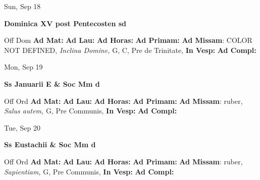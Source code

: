 \documentclass[10pt]{book}
\begin{document}
\begin{center}
\begin{minipage}{3.5in}
\vspace{2em}
\begin{center}Sun, Sep 18
\end{center}
\textbf{ \large Dominica XV post Pentecosten
\textnormal{\normalsize sd}}

\begin{justify}Off Dom
\textbf{Ad Mat: }
\textbf{Ad Lau: }
\textbf{Ad Horas: }
\textbf{Ad Primam: }\textbf{Ad Missam}: COLOR NOT DEFINED, \textit{Inclina Domine,} G, C, Pre de Trinitate, 
\textbf{In Vesp: }
\textbf{Ad Compl: }
\end{justify}
\end{minipage}
\end{center}

\begin{center}
\begin{minipage}{3.5in}
\vspace{2em}
\begin{center}Mon, Sep 19
\end{center}
\textbf{ \large Ss Januarii E \& Soc Mm
\textnormal{\normalsize d}}

\begin{justify}Off Ord
\textbf{Ad Mat: }
\textbf{Ad Lau: }
\textbf{Ad Horas: }
\textbf{Ad Primam: }\textbf{Ad Missam}: ruber, \textit{Salus autem,} G, Pre Communis, 
\textbf{In Vesp: }
\textbf{Ad Compl: }
\end{justify}
\end{minipage}
\end{center}

\begin{center}
\begin{minipage}{3.5in}
\vspace{2em}
\begin{center}Tue, Sep 20
\end{center}
\textbf{ \large Ss Eustachii \& Soc Mm
\textnormal{\normalsize d}}

\begin{justify}Off Ord
\textbf{Ad Mat: }
\textbf{Ad Lau: }
\textbf{Ad Horas: }
\textbf{Ad Primam: }\textbf{Ad Missam}: ruber, \textit{Sapientiam,} G, Pre Communis, 
\textbf{In Vesp: }
\textbf{Ad Compl: }
\end{justify}
\end{minipage}
\end{center}
\end{document}
